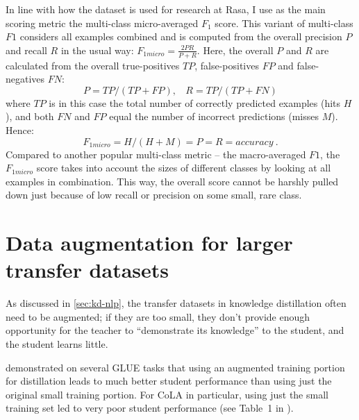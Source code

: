 \documentclass[bsc,frontabs,twoside,singlespacing,parskip,deptreport]{infthesis}
\begin{document}
{{{      In line with how the dataset is used for research at Rasa, I use as the main scoring metric the multi-class micro-averaged $F_1$ score. This variant of multi-class $F1$ considers all examples combined and is computed from the overall precision $P$ and recall $R$ in the usual way: $F_{1 micro} = \frac{2 P R}{P+R}$. Here, the overall $P$ and $R$ are calculated from the overall true-positives $TP$, false-positives $FP$ and false-negatives $FN$:
      \begin{equation}
        P = TP/(TP+FP),\ \ \ \ R = TP/(TP+FN)
      \end{equation}
      where $TP$ is in this case the total number of correctly predicted examples (hits $H$), and both $FN$ and $FP$ equal the number of incorrect predictions (misses $M$). Hence:
      \begin{equation}
        F_{1micro} = H/(H+M) = P = R = accuracy\ .
      \end{equation}
      Compared to another popular multi-class metric -- the macro-averaged $F1$, the $F_{1micro}$ score takes into account the sizes of different classes by looking at all examples in combination. This way, the overall score cannot be harshly pulled down just because of low recall or precision on some small, rare class.
    }
  }

  \section{Data augmentation for larger transfer datasets}{
    \label{sec:augmentation}
    As discussed in \autoref{sec:kd-nlp}, the transfer datasets in knowledge distillation often need to be augmented; if they are too small, they don't provide enough opportunity for the teacher to ``demonstrate its knowledge'' to the student, and the student learns little.

    \citet{Tang_2019b} demonstrated on several GLUE tasks that using an augmented training portion for distillation leads to much better student performance than using just the original small training portion.
    For CoLA in particular, using just the small training set led to very poor student performance (see Table~1 in \citeauthor{Tang_2019b}).
    
}}
\end{document}
